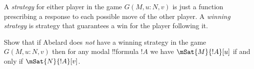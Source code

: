 \documentclass[../../../include/open-logic-section]{subfiles}
\begin{document}
 \begin{definition}
   A \emph{strategy} for either player in the game $G({M}, u :
   {N}, v)$ is just a function prescribing a response to each
   possible move of the other player. A \emph{winning strategy} is
   strategy that guarantees a win for the player following it.
 \end{definition}

\begin{problem}
  Show that if Abelard does \emph{not} have a winning strategy in the game
  $G({M}, u : {N}, v)$ then for any modal !!{formula}
  $!A$ we have $\mSat{M}{!A}[u]$ if and only if
  $\mSat{N}{!A}[v]$. 
\end{problem}
\end{document}
